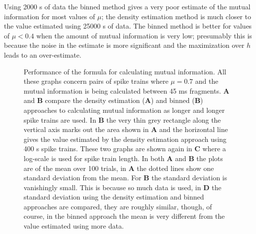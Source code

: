 \documentclass[12pt]{article}
\begin{document}
Using 2000 s of data the binned method gives a very poor estimate of the
mutual information for most values of $\mu$; the density estimation method is much
closer to the value estimated using 25000 s of data. The binned method
is better for values of $\mu<0.4$ when the amount of mutual
information is very low; presumably this is because the noise in the
estimate is more significant and the maximization over $h$ leads to an
over-estimate.


\begin{figure}[tp]
\begin{center}

\end{center}
\caption{Performance of the formula for calculating mutual
  information. All these graphs concern pairs of spike trains where
  $\mu=0.7$ and the mutual information is being calculated between 45
  ms fragments. \textbf{A} and \textbf{B} compare the density
  estimation (\textbf{A}) and binned (\textbf{B}) approaches to
  calculating mutual information as longer and longer spike trains are
  used. In \textbf{B} the very thin grey rectangle along the vertical
  axis marks out the area shown in \textbf{A} and the horizontal line
  gives the value estimated by the density estimation approach using
  400 s spike trains. These two graphs are shown again in \textbf{C}
  where a log-scale is used for spike train length. In both \textbf{A}
  and \textbf{B} the plots are of the mean over 100 trials, in
  \textbf{A} the dotted lines show one standard deviation from the
  mean. For \textbf{B} the standard deviation is vanishingly
  small. This is because so much data is used, in \textbf{D} the
  standard deviation using the density estimation and binned
  approaches are compared, they are roughly similar, though, of
  course, in the binned approach the mean is very different from the
  value estimated using more data.
 \label{fig_length_sweep}}
\end{figure}
\end{document}
